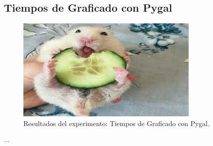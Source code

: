 \subsection{Tiempos de Graficado con Pygal}
\label{exp:pygal-time}

\begin{figure}[H]
    \centering
    \includegraphics[width=0.8\textwidth]{testing/images/pygal_time.png}
    \caption{Resultados del experimento: Tiempos de Graficado con Pygal.}
    \label{fig:pygal-time}
\end{figure}

...
